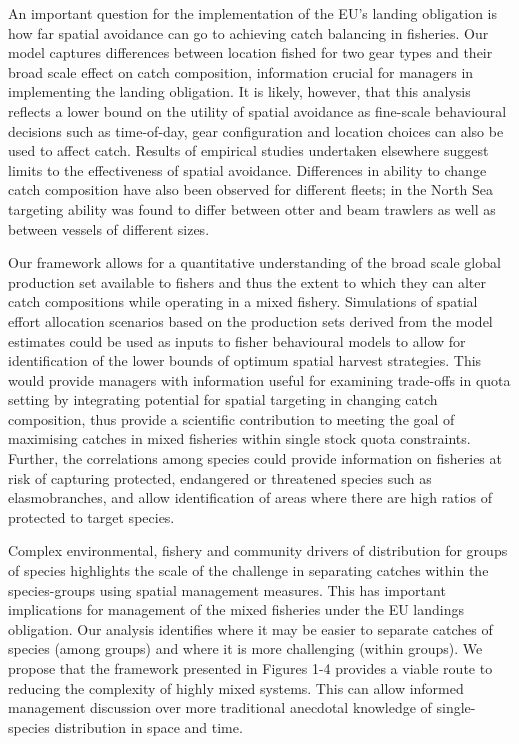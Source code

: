 \documentclass{nature}
\begin{document}
\begin{linenumbers}
An important question for the implementation of the EU's landing obligation is
how far spatial avoidance can go to achieving catch balancing in fisheries.
Our model captures differences between location fished for two gear types and
their broad scale effect on catch composition, information crucial for managers
in implementing the landing obligation.  It is likely, however, that this analysis
reflects a lower bound on the utility of spatial avoidance as fine-scale
behavioural decisions such as time-of-day, gear configuration and location
choices can also be used to affect catch\cite{Abbott2015, Thorson2016}. Results
of empirical studies undertaken elsewhere\cite{Branch2008, Kuriyama2016}
suggest limits to the effectiveness of spatial avoidance. Differences in
ability to change catch composition have also been observed for different
fleets; in the North Sea targeting ability was found to differ between otter
and beam trawlers as well as between vessels of different sizes\cite{Pascoe2007}.  

Our framework allows for a quantitative understanding of the broad scale global
production set available to fishers\cite{Reimer2017} and thus the extent to
which they can alter catch compositions while operating in a mixed fishery.
Simulations of spatial effort allocation scenarios based on the production sets
derived from the model estimates could be used as inputs to fisher behavioural
models to allow for identification of the lower bounds of optimum spatial
harvest strategies. This would provide managers with information useful for
examining trade-offs in quota setting by integrating potential for spatial
targeting in changing catch composition, thus provide a scientific contribution
to meeting the goal of maximising catches in mixed fisheries within single
stock quota constraints\cite{Ulrich2016}. Further, the correlations among
species could provide information on fisheries at risk of capturing protected,
endangered or threatened species such as elasmobranches, and allow
identification of areas where there are high ratios of protected to target
species.


Complex environmental, fishery and community drivers of distribution for groups
of species highlights the scale of the challenge in separating catches within
the species-groups using spatial management measures. This has important
implications for management of the mixed fisheries under the EU landings
obligation. Our analysis identifies where it may be easier to separate
catches of species (among groups) and where it is more challenging (within
groups). We propose that the framework presented in Figures 1-4 provides
a viable route to reducing the complexity of highly mixed systems. 
This can allow informed management discussion over more
traditional anecdotal knowledge of single-species distribution in space and
time.



\end{linenumbers}
\end{document}
